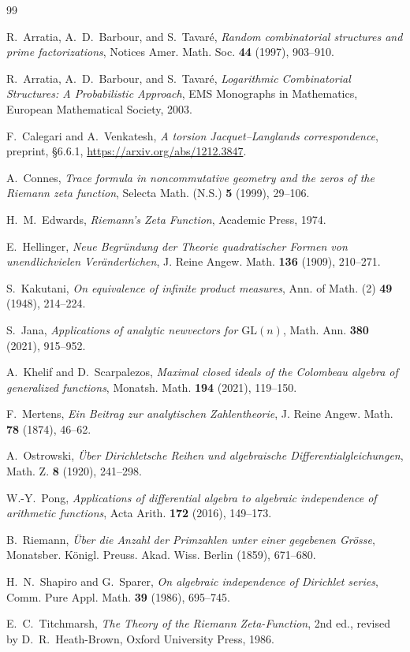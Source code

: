 \documentclass[11pt]{article}
\theoremstyle{definition}
\theoremstyle{remark}
\begin{document}
\small
\begin{thebibliography}{99}

R.~Arratia, A.~D.~Barbour, and S.~Tavar\'e,
\emph{Random combinatorial structures and prime factorizations},
Notices Amer. Math. Soc. \textbf{44} (1997), 903--910.

R.~Arratia, A.~D.~Barbour, and S.~Tavar\'e,
\emph{Logarithmic Combinatorial Structures: A Probabilistic Approach},
EMS Monographs in Mathematics, European Mathematical Society, 2003.

F.~Calegari and A.~Venkatesh,
\emph{A torsion Jacquet--Langlands correspondence},
preprint, \S6.6.1,
\url{https://arxiv.org/abs/1212.3847}.

A.~Connes,
\emph{Trace formula in noncommutative geometry and the zeros of the Riemann zeta function},
Selecta Math. (N.S.) \textbf{5} (1999), 29--106.

H.~M.~Edwards,
\emph{Riemann's Zeta Function},
Academic Press, 1974.

E.~Hellinger,
\emph{Neue Begr\"undung der Theorie quadratischer Formen von unendlichvielen Ver\"anderlichen},
J. Reine Angew. Math. \textbf{136} (1909), 210--271.

S.~Kakutani,
\emph{On equivalence of infinite product measures},
Ann. of Math. (2) \textbf{49} (1948), 214--224.

S.~Jana,
\emph{Applications of analytic newvectors for \(\mathrm{GL}(n)\)},
Math. Ann. \textbf{380} (2021), 915--952.

A.~Khelif and D.~Scarpalezos,
\emph{Maximal closed ideals of the Colombeau algebra of generalized functions},
Monatsh. Math. \textbf{194} (2021), 119--150.

F.~Mertens,
\emph{Ein Beitrag zur analytischen Zahlentheorie},
J. Reine Angew. Math. \textbf{78} (1874), 46--62.

A.~Ostrowski,
\emph{\"Uber Dirichletsche Reihen und algebraische Differentialgleichungen},
Math. Z. \textbf{8} (1920), 241--298.

W.-Y.~Pong,
\emph{Applications of differential algebra to algebraic independence of arithmetic functions},
Acta Arith. \textbf{172} (2016), 149--173.

B.~Riemann,
\emph{\"Uber die Anzahl der Primzahlen unter einer gegebenen Gr\"osse},
Monatsber. K\"onigl. Preuss. Akad. Wiss. Berlin (1859), 671--680.

H.~N.~Shapiro and G.~Sparer,
\emph{On algebraic independence of Dirichlet series},
Comm. Pure Appl. Math. \textbf{39} (1986), 695--745.

E.~C.~Titchmarsh,
\emph{The Theory of the Riemann Zeta-Function}, 2nd ed.,
revised by D.~R.~Heath-Brown, Oxford University Press, 1986.

\end{thebibliography}
\end{document}
